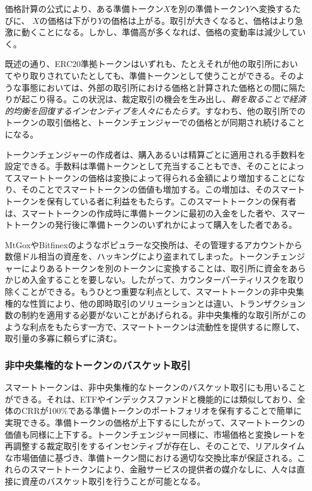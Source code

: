 \documentclass{jsarticle}
\begin{document}
    価格計算の公式により、ある準備トークン$X$を別の準備トークン$Y$へ変換するたびに、 $X$の価格は下がり$Y$の価格は上がる。取引が大きくなると、価格はより急激に動くことになる。しかし、準備高が多くなれば、価格の変動率は減少していく。

    既述の通り、ERC20準拠トークンはいずれも、たとえそれが他の取引所においてやり取りされていたとしても、準備トークンとして使うことができる。そのような事態においては、外部の取引所における価格と計算された価格との間に隔たりが起こり得る。この状況は、裁定取引の機会を生み出し、\emph{鞘を取ることで経済的均衡を回復するインセンティブを人々にもたらす}。すなわち、他の取引所でのトークンの取引価格と、トークンチェンジャーでの価格とが同期され続けることになる。

    トークンチェンジャーの作成者は、購入あるいは精算ごとに適用される手数料を設定できる。手数料は準備トークンとして充当することもでき、そのことによってスマートトークンの価格は変換によって得られる金額により増加することになり、そのことでスマートトークンの価値も増加する。この増加は、そのスマートトークンを保有している者に利益をもたらす。このスマートトークンの保有者は、スマートトークンの作成時に準備トークンに最初の入金をした者や、スマートトークンの発行後に準備トークンのいずれかによって購入をした者である。

    MtGoxやBitfinexのようなポピュラーな交換所は、その管理するアカウントから数億ドル相当の資産を、ハッキングにより盗まれてしまった。トークンチェンジャーによりあるトークンを別のトークンに変換することは、取引所に資金をあらかじめ入金することを要しない。したがって、カウンターパーティリスクを取り除くことができる。もうひとつ重要な利点として、スマートトークンの非中央集権的な性質により、他の即時取引のソリューションとは違い、トランザクション数の制約を適用する必要がないことがあげられる。非中央集権的な取引所がこのような利点をもたらす一方で、スマートトークンは流動性を提供するに際して、取引量の多寡に頼らずに済む。

    \subsubsection{非中央集権的なトークンのバスケット取引}

    スマートトークンは、非中央集権的なトークンのバスケット取引にも用いることができる。それは、ETFやインデックスファンドと機能的には類似しており、全体のCRRが100\%である準備トークンのポートフォリオを保有することで簡単に実現できる。準備トークンの価格が上下するにしたがって、スマートトークンの価値も同様に上下する。トークンチェンジャー同様に、市場価格と変換レートを再調整する裁定取引をするインセンティブが存在し、そのことで、リアルタイムな市場価値に基づき、準備トークン間における適切な交換比率が保証される。これらのスマートトークンにより、金融サービスの提供者の媒介なしに、人々は直接に資産のバスケット取引を行うことが可能となる。
\end{document}
